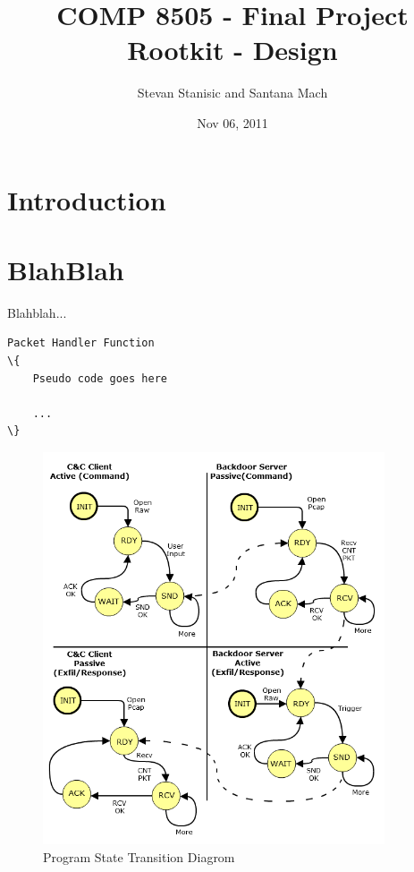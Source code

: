 \documentclass[titlepage]{article}
\begin{document}
\author{Stevan Stanisic and Santana Mach}
\title{COMP 8505 - Final Project \\ Rootkit - Design}
\date{Nov 06, 2011}
\maketitle{}

\tableofcontents
\pagebreak

\section{Introduction}

\section{BlahBlah}

Blahblah...

\begin{lstlisting}
Packet Handler Function
\{
	Pseudo code goes here

	...
\}
\end{lstlisting}

\begin{figure}[htb]                                                                       
  \begin{center}
    \includegraphics[width=0.9\textwidth]{imgs/std.png}
  \end{center}
  \caption{Program State Transition Diagrom}
  \label{fig:std}
\end{figure}
\end{document}
